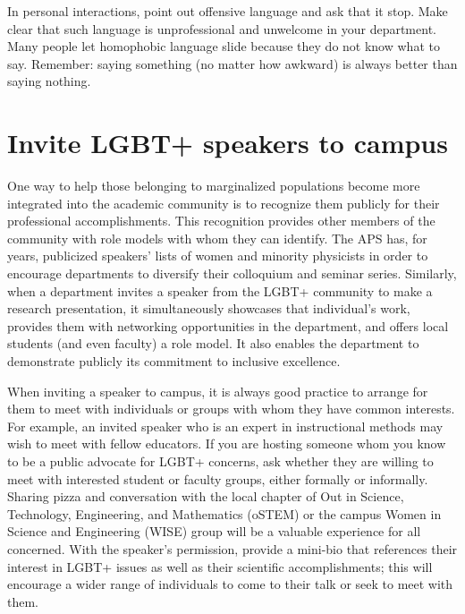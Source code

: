 In personal interactions, point out offensive language and ask that it stop.  Make clear that such language is unprofessional and unwelcome in your department.  Many people let homophobic language slide because they do not know what to say.  Remember: saying something (no matter how awkward) is always better than saying nothing.


\section {Invite LGBT+ speakers to campus}
\label{lgbt-speakers}
One way to help those belonging to marginalized populations become more integrated into the academic community is to recognize them publicly for their professional accomplishments. This recognition provides other members of the community with role models with whom they can identify. The APS has, for years, publicized speakers' lists of women and minority physicists in order to encourage departments to diversify their colloquium and seminar series.  Similarly, when a department invites a speaker from the LGBT+ community to make a research presentation, it simultaneously showcases that individual's work, provides them with networking opportunities in the department, and offers local students (and even faculty) a role model. It also enables the department to demonstrate publicly its commitment to inclusive excellence.

When {inviting a speaker to campus}, it is always good practice to arrange for them to meet with individuals or groups with whom they have common interests. For example, an invited speaker who is an expert in instructional methods may wish to meet with fellow educators. If you are hosting someone whom you know to be a public advocate for LGBT+ concerns, ask whether they are willing to meet with interested student or faculty groups, either formally or informally.  Sharing pizza and conversation with the local chapter of Out in Science, Technology, Engineering, and Mathematics (oSTEM) or the campus Women in Science and Engineering (WISE) group will be a valuable experience for all concerned.  With the speaker's permission, {provide a mini-bio that references their interest in LGBT+ issues} as well as their scientific accomplishments; this will encourage a wider range of individuals to come to their talk or seek to meet with them.  
\newpage
